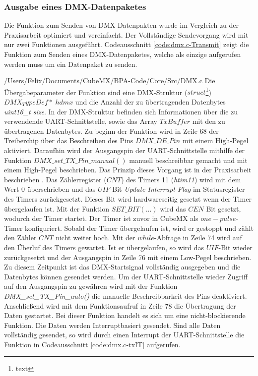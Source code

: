 \subsubsection{Ausgabe eines DMX-Datenpaketes}
Die Funktion zum Senden von DMX-Datenpakten wurde im Vergleich zu der Praxisarbeit optimiert und vereinfacht. Der Vollständige Sendevorgang wird mit nur zwei Funktionen ausgeführt. Codeausschnitt \ref{code:dmx.c-Transmit} zeigt die Funktion zum Senden eines DMX-Datenpaketes, welche als einzige aufgerufen werden muss um ein Datenpaket zu senden.

{/Users/Felix/Documents/CubeMX/BPA-Code/Core/Src/DMX.c}
Die Übergabeparameter der Funktion sind eine DMX-Struktur ($struct$\footnote{text}) $DMX_TypeDef*\ hdmx$ und die Anzahl der zu übertragenden Datenbytes \textit{uint16\_t size}. In der DMX-Struktur befinden sich Informationen über die zu verwendende UART-Schnittstelle, %
sowie das Array $TxBuffer$ mit den zu übertragenen Datenbytes. Zu beginn der Funktion wird in Zeile 68 der Treiberchip über das Beschreiben des Pins $DMX\_DE\_Pin$ mit einem High-Pegel aktiviert. Daraufhin wird der Ausgangspin der UART-Schnittstelle mithilfe der Funktion $DMX\_set\_TX\_Pin\_manual()$ manuell beschreibbar gemacht und mit einem High-Pegel beschrieben. Das Prinzip dieses Vorgang ist in der Praxisarbeit beschrieben \cite{Bauer2021}. %
Das Zählerregister ($CNT$) des Timers 11 (\textit{htim11}) wird mit dem Wert 0 überschrieben und das $UIF$-Bit \textit{Update Interrupt Flag} im Statusregister des Timers zurückgesetzt. Dieses Bit wird hardwareseitig gesetzt wenn der Timer übergelaufen ist. Mit der Funktion $SET\_BIT(...)$ wird das $CEN$ Bit gesetzt, wodurch der Timer startet. Der Timer ist zuvor in CubeMX als $one-pulse$-Timer%
konfiguriert. Sobald der Timer übergelaufen ist, wird er gestoppt und zählt den Zähler $CNT$ nicht weiter hoch. Mit der $while$-Abfrage in Zeile 74 wird auf den Überluf des Timers gewartet. Ist er übergelaufen, so wird das $UIF$-Bit wieder zurückgesetzt und der Ausgangspin in Zeile 76 mit einem Low-Pegel beschrieben. Zu diesem Zeitpunkt ist das DMX-Startsignal vollständig ausgegeben und die Datenbytes können gesendet werden. Um der UART-Schnittstelle wieder Zugriff auf den Ausgangspin zu gewähren wird mit der Funktion \textit{DMX\_set\_TX\_Pin\_auto()} die manuelle Beschreibbarkeit des Pins deaktiviert. Anschließend wird mit dem Funktionsaufruf in Zeile 78 die Übertragung der Daten gestartet. Bei dieser Funktion handelt es sich um eine nicht-blockierende Funktion. Die Daten werden Interruptbasiert gesendet. Sind alle Daten vollständig gesendet, so wird durch einen Interrupt der UART-Schnittstelle die Funktion in Codeausschnitt \ref{code:dmx.c-txIT} aufgerufen.
